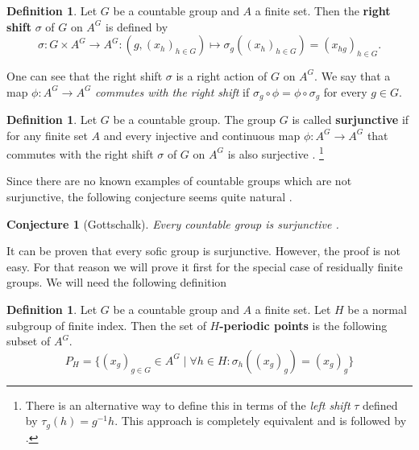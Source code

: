\documentclass[titlepage, a4paper]{article}
\theoremstyle{theoremdd}
\newtheorem{conjecture}[theorem]{Conjecture}
\theoremstyle{definition}
\newtheorem{definition}[theorem]{Definition}
\theoremstyle{remark}
\begin{document}
    \begin{definition}
	    Let $G$ be a countable group and $A$ a finite set. Then the \textbf{right shift} $\sigma$ of $G$ on $A^G$ is defined by
        \[
        \sigma: G \times A^G \to A^G: \left(g, (x_{h})_{h \in G} \right) \mapsto \sigma_g((x_{h})_{h \in G}) = \left( x_{hg} \right)_{h \in G}.
        \]
    \end{definition}

    One can see that the right shift $\sigma$ is a right action of $G$ on $A^G$. We say that a map $\phi: A^G \to A^G$ \emph{commutes with the right shift} if $\sigma_g \circ \phi = \phi \circ \sigma_g$ for every $g \in G$.
    
    \begin{definition}
	    Let $G$ be a countable group. The group $G$ is called \textbf{surjunctive} if for any finite set $A$ and every injective and continuous map $\phi: A^{G}\to A^{G}$ that commutes with the right shift $\sigma$ of $G$ on $A^G$ is also surjective \cite[section 1]{weiss_2000} .
	    \footnote{There is an alternative way to define this in terms of the \emph{left shift} $\tau$ defined by $\tau_g(h)= g^{-1}h$. This approach is completely equivalent and is followed by \cite[paragraph 2.13.5 - 2.13.7]{capraro_lupini_2015}.}
    \end{definition}

Since there are no known examples of countable groups which are not surjunctive, the following conjecture seems quite natural \cite[introduction]{weiss_2000}.

    \begin{conjecture}[Gottschalk] \label{conj:gottschalk}
        Every countable group is surjunctive  .
    \end{conjecture}

    It can be proven that every sofic group is surjunctive. However, the proof is not easy. For that reason we will prove it first for the special case of residually finite groups. We will need the following definition
\begin{definition}
    Let $G$ be a countable group and $A$ a finite set. Let $H$ be a normal subgroup of finite index. Then the set of \textbf{$H$-periodic points} is the following subset of $A^G$.
        \[
        P_H = \{ (x_g)_{g \in G} \in A^G  \mid \forall h \in H: \sigma_h((x_g)_g) = (x_g)_g\}
        \]
\end{definition}
\end{document}
